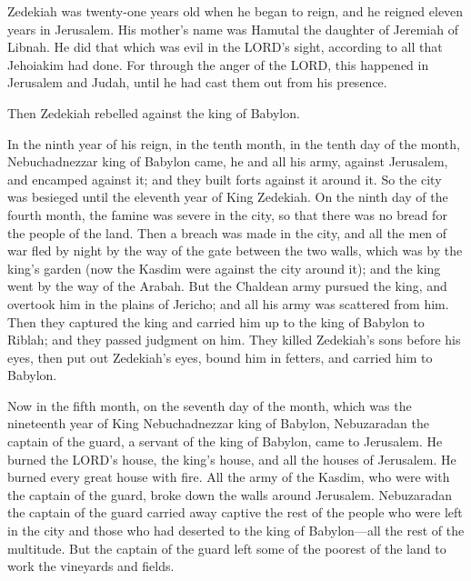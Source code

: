 \myverse{}Zedekiah was twenty-one years old when he began to reign, and
he reigned eleven years in Jerusalem. His mother’s name was Hamutal the daughter of Jeremiah of Libnah.
\myverse{}He did that which was evil in the LORD’s sight, according to all that Jehoiakim
had done.
\myverse{}For through the anger of the LORD, this happened in Jerusalem and Judah,
until he had cast them out from his presence.

Then Zedekiah rebelled against the king of Babylon.


\mychapter{} \myverse*{}In the ninth year of his reign, in the tenth month, in the tenth
day of the month, Nebuchadnezzar king of Babylon came, he and all his army, against Jerusalem, and encamped
against it; and they built forts against it around it.
\myverse{}So the city was besieged until the eleventh year of King Zedekiah.
\myverse{}On the ninth day of the fourth month, the famine was severe in the city, so
that there was no bread for the people of the land.
\myverse{}Then a breach was made in the city, and all the men of war fled by night by
the way of the gate between the two walls, which was by the king’s garden (now the Kasdim were against
the city around it); and the king went by the way of the Arabah.
\myverse{}But the Chaldean army pursued the king, and overtook him in the plains of Jericho;
and all his army was scattered from him.
\myverse{}Then they captured the king and carried him up to the king of Babylon to Riblah;
and they passed judgment on him.
\myverse{}They killed Zedekiah’s sons before his eyes, then put out Zedekiah’s eyes,
bound him in fetters, and carried him to Babylon.

\myverse{}Now in the fifth month, on the seventh day of the month, which
was the nineteenth year of King Nebuchadnezzar king of Babylon, Nebuzaradan the captain of the guard,
a servant of the king of Babylon, came to Jerusalem.
\myverse{}He burned the LORD’s house, the king’s house, and all the houses of Jerusalem.
He burned every great house with fire.
\myverse{}All the army of the Kasdim, who were with the captain of the guard, broke
down the walls around Jerusalem.
\myverse{}Nebuzaradan the captain of the guard carried away captive the rest of the
people who were left in the city and those who had deserted to the king of Babylon—all the rest of the
multitude.
\myverse{}But the captain of the guard left some of the poorest of the land to work
the vineyards and fields.

